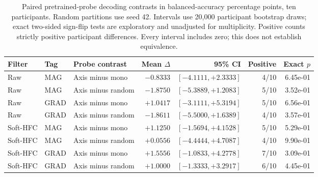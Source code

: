 \begin{table}[htbp]\centering\small
\begin{tabular}{lllrrrr}
\toprule
Filter & Tag & Probe contrast & Mean $\Delta$ & 95\% CI & Positive & Exact $p$ \\
\midrule
Raw & MAG & Axis minus mono & $-0.8333$ & $[-4.1111, +2.3333]$ & 4/10 & 6.45e-01 \\
Raw & MAG & Axis minus random & $-1.8750$ & $[-5.3889, +1.2083]$ & 5/10 & 3.52e-01 \\
Raw & GRAD & Axis minus mono & $+1.0417$ & $[-3.1111, +5.3194]$ & 5/10 & 6.56e-01 \\
Raw & GRAD & Axis minus random & $-1.8611$ & $[-5.5000, +1.6389]$ & 4/10 & 3.57e-01 \\
Soft-HFC & MAG & Axis minus mono & $+1.1250$ & $[-1.5694, +4.1528]$ & 5/10 & 5.29e-01 \\
Soft-HFC & MAG & Axis minus random & $+0.0556$ & $[-4.4444, +4.7087]$ & 4/10 & 9.90e-01 \\
Soft-HFC & GRAD & Axis minus mono & $+1.5556$ & $[-1.0833, +4.2778]$ & 7/10 & 3.09e-01 \\
Soft-HFC & GRAD & Axis minus random & $+1.0000$ & $[-1.3333, +3.2917]$ & 6/10 & 4.45e-01 \\
\bottomrule\end{tabular}
\caption{Paired pretrained-probe decoding contrasts in balanced-accuracy percentage points, ten participants. Random partitions use seed 42. Intervals use 20{,}000 participant bootstrap draws; exact two-sided sign-flip tests are exploratory and unadjusted for multiplicity. Positive counts strictly positive participant differences. Every interval includes zero; this does not establish equivalence.}
\label{tab:s-decoding-contrasts}\end{table}

